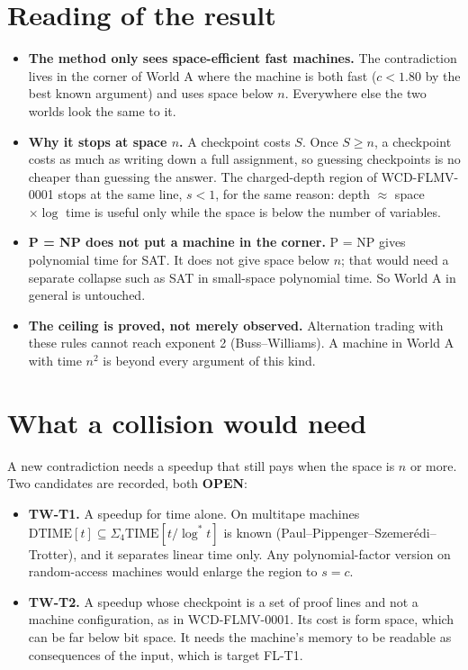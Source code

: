 \documentclass[11pt]{article}
\begin{document}
\section{Reading of the result}
\begin{itemize}
\item \textbf{The method only sees space-efficient fast machines.} The contradiction lives in the corner of World A where the machine is both fast ($c<1.80$ by the best known argument) and uses space below $n$. Everywhere else the two worlds look the same to it.
\item \textbf{Why it stops at space $n$.} A checkpoint costs $S$. Once $S\ge n$, a checkpoint costs as much as writing down a full assignment, so guessing checkpoints is no cheaper than guessing the answer. The charged-depth region of WCD-FLMV-0001 stops at the same line, $s<1$, for the same reason: depth $\approx$ space $\times\log$ time is useful only while the space is below the number of variables.
\item \textbf{P = NP does not put a machine in the corner.} P = NP gives polynomial time for SAT. It does not give space below $n$; that would need a separate collapse such as SAT in small-space polynomial time. So World A in general is untouched.
\item \textbf{The ceiling is proved, not merely observed.} Alternation trading with these rules cannot reach exponent 2 (Buss--Williams). A machine in World A with time $n^{2}$ is beyond every argument of this kind.
\end{itemize}

\section{What a collision would need}
A new contradiction needs a speedup that still pays when the space is $n$ or more. Two candidates are recorded, both \textbf{OPEN}:
\begin{itemize}
\item \textbf{TW-T1.} A speedup for time alone. On multitape machines $\mathrm{DTIME}[t]\subseteq\Sigma_4\mathrm{TIME}[t/\log^{*}t]$ is known (Paul--Pippenger--Szemer\'edi--Trotter), and it separates linear time only. Any polynomial-factor version on random-access machines would enlarge the region to $s=c$.
\item \textbf{TW-T2.} A speedup whose checkpoint is a set of proof lines and not a machine configuration, as in WCD-FLMV-0001. Its cost is form space, which can be far below bit space. It needs the machine's memory to be readable as consequences of the input, which is target FL-T1.
\end{itemize}
\end{document}
